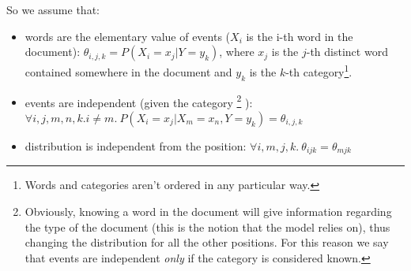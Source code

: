 So we assume that:
\begin{itemize}
  \item words are the elementary value of events ($ X_i $ is the i-th word in the document): $ \theta_{i, j, k} = P(X_i = x_j | Y = y_k) $, where $ x_j $ is the $ j $-th distinct word contained somewhere in the document and $ y_k $ is the $ k $-th category\footnote{Words and categories aren't ordered in any particular way.}.
\item events are independent (given the category
  \footnote{Obviously, knowing a word in the document will give information regarding the type of the document (this is the notion that the model relies on), thus changing the distribution for all the other positions. For this reason we say that events are independent \textit{only} if the category is considered known.}
  ): $ \forall i,j,m,n,k. i \neq m.\  P(X_i = x_j | X_m = x_n, Y = y_k) = \theta_{i,j,k} $
  \item distribution is independent from the position: $ \forall i,m,j,k. \ \theta_{ijk} = \theta_{mjk} $
\end{itemize}


